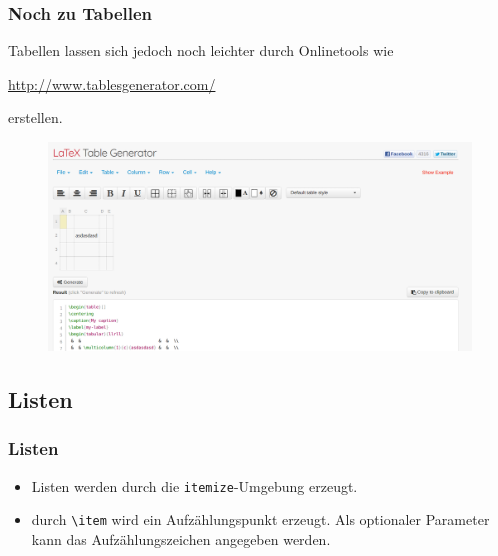\begin{frame}[fragile,t]
\frametitle{Noch zu Tabellen}
Tabellen lassen sich jedoch noch leichter durch Onlinetools wie
\begin{center}
\url{http://www.tablesgenerator.com/}
\end{center}
erstellen.

\begin{figure}[htp]
\centering
\includegraphics[scale=0.18]{images/onlinetable.png}
\end{figure}
\end{frame}



\subsection{Listen}

\begin{frame}[fragile]
\frametitle{Listen}
\begin{itemize}[<+->]
  \item Listen werden durch die \texttt{itemize}-Umgebung erzeugt.
  \item durch \lstinline[style=Latex]+\item+ wird ein Aufzählungspunkt erzeugt. Als optionaler Parameter kann das Aufzählungszeichen angegeben werden.
\end{itemize}
\end{frame}

